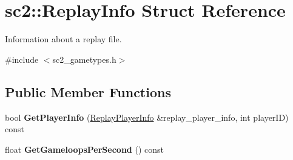 \hypertarget{structsc2_1_1_replay_info}{}\section{sc2\+:\+:Replay\+Info Struct Reference}
\label{structsc2_1_1_replay_info}


Information about a replay file.  




{\ttfamily \#include $<$sc2\+\_\+gametypes.\+h$>$}

\subsection*{Public Member Functions}
\begin{DoxyCompactItemize}
\item 
\mbox{\label{structsc2_1_1_replay_info_abb9ba35eb93d93ecab903c7022d66288}} 
bool {\bfseries Get\+Player\+Info} (\hyperlink{structsc2_1_1_replay_player_info}{Replay\+Player\+Info} \&replay\+\_\+player\+\_\+info, int player\+ID) const
\item 
\mbox{\label{structsc2_1_1_replay_info_ad737b30d1547c2c6c03ebbcd80a8833a}} 
float {\bfseries Get\+Gameloops\+Per\+Second} () const
\end{DoxyCompactItemize}
